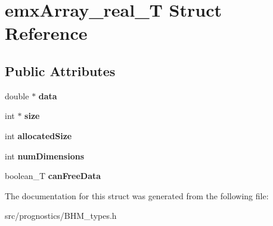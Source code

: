 \hypertarget{structemxArray__real__T}{}\section{emx\+Array\+\_\+real\+\_\+T Struct Reference}
\label{structemxArray__real__T}
\subsection*{Public Attributes}
\begin{DoxyCompactItemize}
\item 
\mbox{\label{structemxArray__real__T_a6b67f49069ed22f0d3b279311556673b}} 
double $\ast$ {\bfseries data}
\item 
\mbox{\label{structemxArray__real__T_ae35a0efd2270005222199de29c4af14a}} 
int $\ast$ {\bfseries size}
\item 
\mbox{\label{structemxArray__real__T_a5b2f3851c281343f0133130e64efa16f}} 
int {\bfseries allocated\+Size}
\item 
\mbox{\label{structemxArray__real__T_a0261ff29e99fb919f2f91dade0fd4db9}} 
int {\bfseries num\+Dimensions}
\item 
\mbox{\label{structemxArray__real__T_af419e9121ddb3edfab42b19a6575cbc5}} 
boolean\+\_\+T {\bfseries can\+Free\+Data}
\end{DoxyCompactItemize}


The documentation for this struct was generated from the following file\+:\begin{DoxyCompactItemize}
\item 
src/prognostics/B\+H\+M\+\_\+types.\+h\end{DoxyCompactItemize}
